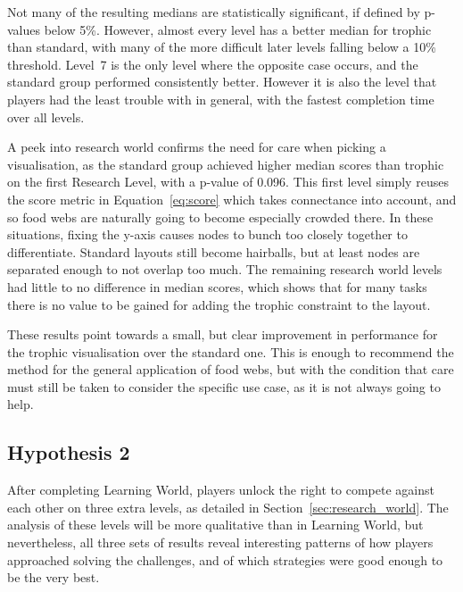 Not many of the resulting medians are statistically significant, if defined by p-values below 5\%. However, almost every level has a better median for trophic than standard, with many of the more difficult later levels falling below a 10\% threshold.
Level~7 is the only level where the opposite case occurs, and the standard group performed consistently better. However it is also the level that players had the least trouble with in general, with the fastest completion time over all levels.

A peek into research world confirms the need for care when picking a visualisation, as the standard group achieved higher median scores than trophic on the first Research Level, with a p-value of 0.096. This first level simply reuses the score metric in Equation~\eqref{eq:score} which takes connectance into account, and so food webs are naturally going to become especially crowded there. In these situations, fixing the y-axis causes nodes to bunch too closely together to differentiate. Standard layouts still become hairballs, but at least nodes are separated enough to not overlap too much.
The remaining research world levels had little to no difference in median scores, which shows that for many tasks there is no value to be gained for adding the trophic constraint to the layout.

These results point towards a small, but clear improvement in performance for the trophic visualisation over the standard one. This is enough to recommend the method for the general application of food webs, but with the condition that care must still be taken to consider the specific use case, as it is not always going to help.

\subsection{Hypothesis 2}
\label{sec:hypothesis2}

After completing Learning World, players unlock the right to compete against each other on three extra levels, as detailed in Section~\ref{sec:research_world}.
The analysis of these levels will be more qualitative than in Learning World, but nevertheless, all three sets of results reveal interesting patterns of how players approached solving the challenges, and of which strategies were good enough to be the very best.

